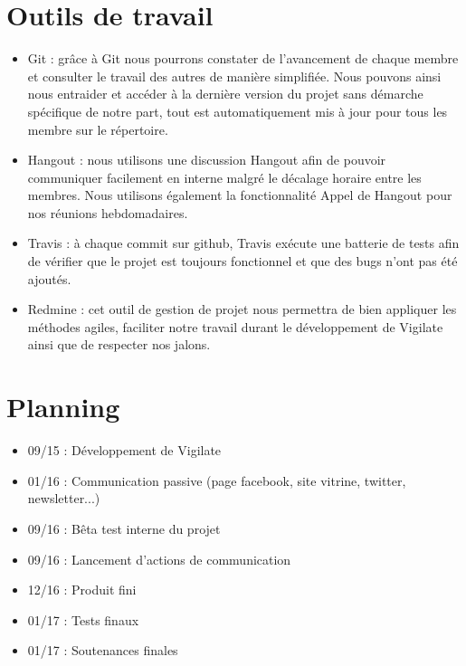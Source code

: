 \section{Outils de travail}
\begin{itemize}
\item Git : grâce à Git nous pourrons constater de l’avancement de chaque membre et consulter le travail des autres de manière simplifiée. Nous pouvons ainsi nous entraider et accéder à la dernière version du projet sans démarche spécifique de notre part, tout est automatiquement mis à jour pour tous les membre sur le répertoire.\\
\item Hangout : nous utilisons une discussion Hangout afin de pouvoir communiquer facilement en interne malgré le décalage horaire entre les membres. Nous utilisons également la fonctionnalité Appel de Hangout pour nos réunions hebdomadaires.\\
\item Travis : à chaque commit sur github, Travis exécute une batterie de tests afin de vérifier que le projet est toujours fonctionnel et que des bugs n’ont pas été ajoutés.\\
\item Redmine : cet outil de gestion de projet nous permettra de bien appliquer les méthodes agiles, faciliter notre travail durant le développement de Vigilate ainsi que de respecter nos jalons.\\
\end{itemize}
\section{Planning}
\begin{itemize}
\item 09/15 : Développement de Vigilate\\
\item 01/16 : Communication passive (page facebook, site vitrine, twitter, newsletter...)\\
\item 09/16 : Bêta test interne du projet\\
\item 09/16 : Lancement d’actions de communication\\
\item 12/16 : Produit fini\\
\item 01/17 : Tests finaux\\
\item 01/17 : Soutenances finales\\
\end{itemize}


